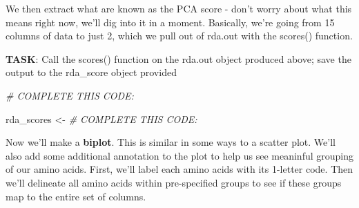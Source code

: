 \documentclass[
]{book}
\newenvironment{Shaded}{\begin{snugshade}}{\end{snugshade}}
\newcommand{\AttributeTok}[1]{\textcolor[rgb]{0.77,0.63,0.00}{#1}}
\newcommand{\CommentTok}[1]{\textcolor[rgb]{0.56,0.35,0.01}{\textit{#1}}}
\newcommand{\DecValTok}[1]{\textcolor[rgb]{0.00,0.00,0.81}{#1}}
\newcommand{\FloatTok}[1]{\textcolor[rgb]{0.00,0.00,0.81}{#1}}
\newcommand{\FunctionTok}[1]{\textcolor[rgb]{0.00,0.00,0.00}{#1}}
\newcommand{\NormalTok}[1]{#1}
\newcommand{\OtherTok}[1]{\textcolor[rgb]{0.56,0.35,0.01}{#1}}
\newcommand{\SpecialCharTok}[1]{\textcolor[rgb]{0.00,0.00,0.00}{#1}}
\newcommand{\StringTok}[1]{\textcolor[rgb]{0.31,0.60,0.02}{#1}}
\begin{document}
We then extract what are known as the PCA score - don't worry about what this means right now, we'll dig into it in a moment. Basically, we're going from 15 columns of data to just 2, which we pull out of rda.out with the scores() function.

\textbf{TASK}: Call the scores() function on the rda.out object produced above; save the output to the rda\_score object provided

\begin{Shaded}
\begin{Highlighting}[]
\CommentTok{\# COMPLETE THIS CODE:}

\NormalTok{rda\_scores }\OtherTok{\textless{}{-}} \CommentTok{\# COMPLETE THIS CODE:}
\end{Highlighting}
\end{Shaded}

Now we'll make a \textbf{biplot}. This is similar in some ways to a scatter plot. We'll also add some additional annotation to the plot to help us see meaninful grouping of our amino acids. First, we'll label each amino acids with its 1-letter code. Then we'll delineate all amino acids within pre-specified groups to see if these groups map to the entire set of columns.

\begin{Shaded}
\end{Shaded}
\end{document}
